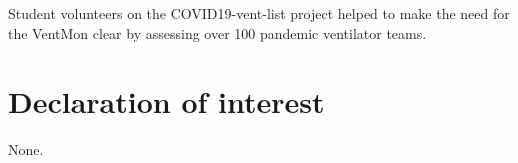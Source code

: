 \documentclass[11pt, letterpaper]{article}
\begin{document}
Student volunteers on the COVID19-vent-list project\cite{} helped to make the need for the VentMon clear by assessing over 100
pandemic ventilator teams.

\section{Declaration of interest}

None.




\iffalse

\section*{References}

\textit{\begin{itemize}
\item Include at least one reference, to the original publication of the hardware you customized.
\item Include other references as required. Include references to put your device in context in the literature. For more information on the reference format in HardwareX please see the Guide for Authors at: https://www.elsevier.com/journals/hardwarex/2468-0672/guide-for-authors
\end{itemize}}


\fi
\end{document}
